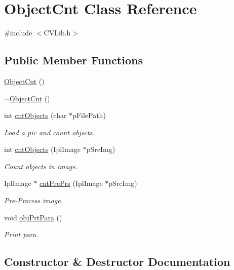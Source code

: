 \hypertarget{class_object_cnt}{}\section{Object\+Cnt Class Reference}
\label{class_object_cnt}


{\ttfamily \#include $<$C\+V\+Lib.\+h$>$}

\subsection*{Public Member Functions}
\begin{DoxyCompactItemize}
\item 
\hyperlink{class_object_cnt_aecc5f6a203aa0572559215f2ccdc459a}{Object\+Cnt} ()
\item 
\hyperlink{class_object_cnt_afa0f098a70359d2d791bfa9473405327}{$\sim$\+Object\+Cnt} ()
\item 
int \hyperlink{class_object_cnt_a840e44b639fd8a362a9676b18befc65f}{cnt\+Objects} (char $\ast$p\+File\+Path)
\begin{DoxyCompactList}\small\item\em Load a pic and count objects. \end{DoxyCompactList}\item 
int \hyperlink{class_object_cnt_a68be9930bdad0c1b2b76a0f072fadc15}{cnt\+Objects} (Ipl\+Image $\ast$p\+Src\+Img)
\begin{DoxyCompactList}\small\item\em Count objects in image. \end{DoxyCompactList}\item 
Ipl\+Image $\ast$ \hyperlink{class_object_cnt_aea33d90f71137cd874ab1d334111570e}{cnt\+Pre\+Prs} (Ipl\+Image $\ast$p\+Src\+Img)
\begin{DoxyCompactList}\small\item\em Pre-\/\+Process image. \end{DoxyCompactList}\item 
void \hyperlink{class_object_cnt_a425fa0bf210dd4a93a7a187a91cfa268}{obj\+Prt\+Para} ()
\begin{DoxyCompactList}\small\item\em Print para. \end{DoxyCompactList}\end{DoxyCompactItemize}


\subsection{Constructor \& Destructor Documentation}
